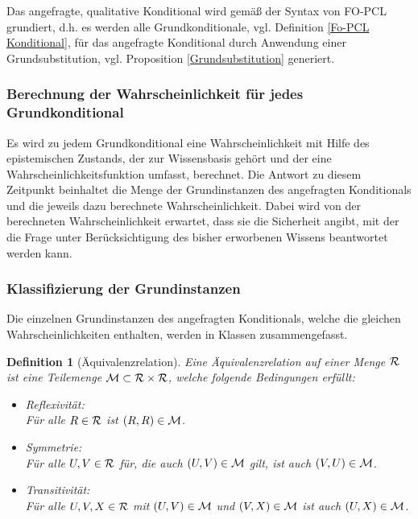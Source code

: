 \documentclass[draft]{scrreprt}
\newtheorem{Def}{Definition }[section]
\begin{document}
Das angefragte, qualitative Konditional wird gemäß der Syntax von FO-PCL grundiert, d.h. es werden alle Grundkonditionale, vgl. Definition \ref{Fo-PCL Konditional}, für das angefragte Konditional durch Anwendung einer Grundsubstitution, vgl. Proposition \ref{Grundsubstitution} generiert.

\subsubsection{Berechnung der Wahrscheinlichkeit für jedes Grundkonditional}
Es wird zu jedem Grundkonditional eine Wahrscheinlichkeit mit Hilfe des epistemischen Zustands, der zur Wissensbasis gehört und der eine Wahrscheinlichkeitsfunktion umfasst, berechnet. Die Antwort zu diesem Zeitpunkt beinhaltet die Menge der Grundinstanzen des angefragten Konditionals und die jeweils dazu berechnete Wahrscheinlichkeit. Dabei wird von der berechneten Wahrscheinlichkeit erwartet, dass sie die Sicherheit angibt, mit der die Frage unter Berücksichtigung des bisher erworbenen Wissens beantwortet werden kann.
	
\subsubsection{Klassifizierung der Grundinstanzen} 
Die einzelnen Grundinstanzen des angefragten Konditionals, welche die gleichen Wahrscheinlichkeiten enthalten, werden in Klassen zusammengefasst.

\begin{Def}[Äquivalenzrelation] \label{Äquivalenzrelation}
Eine Äquivalenzrelation auf einer Menge $ \cal{R} $  ist eine Teilemenge $ \cal{M} \subset \cal{R} \times \cal{R}$, welche folgende Bedingungen erfüllt:
\begin{itemize}
	\item Reflexivität:\\
	 Für alle $ R \in \cal{R} $ ist $ (R,R) \in \cal{M} $.
	\item Symmetrie: \\
	Für alle $ U,V \in \cal{R} $ für, die auch  $ (U,V) \in \cal{M} $ gilt, ist auch  $ (V,U) \in \cal{M} $.
	\item  Transitivität:\\
	Für alle $ U,V,X  \in \cal{R} $ mit $ (U,V) \in \cal{M} $ und $ (V,X) \in \cal{M} $ ist auch $ (U,X) \in \cal{M} $.
\end{itemize}
\end{Def}
\end{document}
